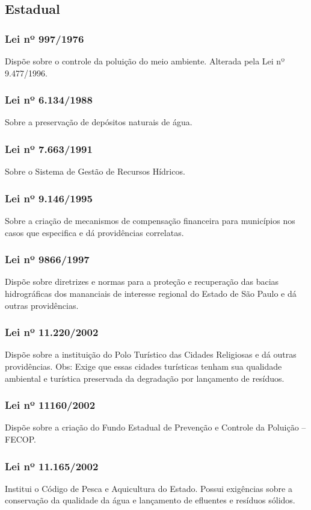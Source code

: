 \begin{subapend}
	\subsection{Estadual}
	\begin{subsubapend}
		\item \subsubsection{Lei nº 997/1976}
		Dispõe sobre o controle da poluição do meio ambiente. Alterada pela Lei nº 9.477/1996.
		\subsubsection{Lei nº 6.134/1988}
		Sobre a preservação de depósitos naturais de água.
		\subsubsection{Lei nº 7.663/1991}
		Sobre o Sistema de Gestão de Recursos Hídricos.
		\subsubsection{Lei nº 9.146/1995}
		Sobre a criação de mecanismos de compensação financeira para municípios nos casos que especifica e dá providências correlatas.
		\subsubsection{Lei nº 9866/1997}
		Dispõe sobre diretrizes e normas para a proteção e recuperação das bacias hidrográficas dos mananciais de interesse regional do Estado de São Paulo e dá outras providências.
		\subsubsection{Lei nº 11.220/2002}
		Dispõe sobre a instituição do Polo Turístico das Cidades Religiosas e dá outras providências. Obs: Exige que essas cidades turísticas tenham sua qualidade ambiental e turística preservada da degradação por lançamento de resíduos.
		\subsubsection{Lei nº 11160/2002}
		Dispõe sobre a criação do Fundo Estadual de Prevenção e Controle da Poluição – FECOP.
		\subsubsection{Lei nº 11.165/2002}
		Institui o Código de Pesca e Aquicultura do Estado. Possui exigências sobre a conservação da qualidade da água e lançamento de efluentes e resíduos sólidos.

\end{subsubapend}
\end{subapend}
